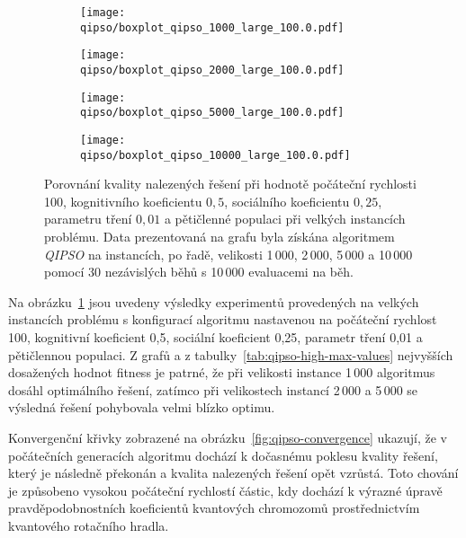 \begin{figure}[ht!]
    \centering
    \begin{subfigure}[b]{0.24\textwidth}
      \texttt{[image: qipso/boxplot\_qipso\_1000\_large\_100.0.pdf]}
    \end{subfigure}
    \hfill
    \begin{subfigure}[b]{0.24\textwidth}
        \texttt{[image: qipso/boxplot\_qipso\_2000\_large\_100.0.pdf]}
    \end{subfigure}
    \hfill
    \begin{subfigure}[b]{0.24\textwidth}
        \texttt{[image: qipso/boxplot\_qipso\_5000\_large\_100.0.pdf]}
    \end{subfigure}
    \hfill
    \begin{subfigure}[b]{0.24\textwidth}
        \texttt{[image: qipso/boxplot\_qipso\_10000\_large\_100.0.pdf]}
    \end{subfigure}
    \caption{Porovnání kvality nalezených řešení při hodnotě počáteční rychlosti 100, kognitivního koeficientu $0{,}5$, sociálního koeficientu $0{,}25$, parametru tření $0{,}01$ a pětičlenné populaci při velkých instancích problému. Data prezentovaná na grafu byla získána algoritmem \emph{QIPSO} na instancích, po řadě, velikosti 1\,000, 2\,000, 5\,000 a 10\,000 pomocí 30 nezávislých běhů s 10\,000 evaluacemi na běh.}
    \label{fig:qipso-large}
\end{figure}

Na obrázku~\ref{fig:qipso-large} jsou uvedeny výsledky experimentů provedených na velkých instancích problému s konfigurací algoritmu nastavenou na počáteční rychlost 100, kognitivní koeficient 0{,}5, sociální koeficient 0{,}25, parametr tření 0{,}01 a pětičlennou populaci.
Z grafů a z tabulky~\ref{tab:qipso-high-max-values} nejvyšších dosažených hodnot fitness je patrné, že při velikosti instance 1\,000 algoritmus dosáhl optimálního řešení, zatímco při velikostech instancí 2\,000 a 5\,000 se výsledná řešení pohybovala velmi blízko optimu. 

\newpage
Konvergenční křivky zobrazené na obrázku~\ref{fig:qipso-convergence} ukazují, že v počátečních generacích algoritmu dochází k dočasnému poklesu kvality řešení, který je následně překonán a kvalita nalezených řešení opět vzrůstá.  
Toto chování je způsobeno vysokou počáteční rychlostí částic, kdy dochází k výrazné úpravě pravděpodobnostních koeficientů kvantových chromozomů prostřednictvím kvantového rotačního hradla.

